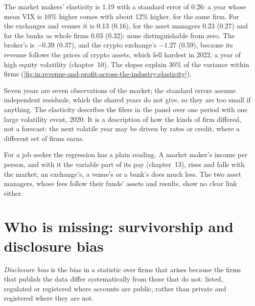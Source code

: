 The market makers' elasticity is 1.19 with a standard error of 0.26: a year whose mean VIX is 10\% higher comes with
 about 12\% higher, for the same firm. For the exchanges and venues it is 0.13 (0.16), for the asset
managers 0.23 (0.27) and for the banks as whole firms 0.03 (0.32): none distinguishable from zero. The broker's is
$-0.39$ (0.37), and the crypto exchange's $-1.27$ (0.59), because its revenue follows the prices of crypto assets, which
fell hardest in 2022, a year of high equity volatility (chapter~10). The slopes explain 30\% of the variance within
firms (\cref{fig:in:revenue-and-profit-across-the-industry:elasticity}).

\begin{remark}\label{rem:in:revenue-and-profit-across-the-industry:elasticity}
Seven years are seven observations of the market; the standard errors assume independent residuals, which the shared
years do not give, so they are too small if anything. The elasticity describes the filers in the panel over one period
with one large volatility event, 2020. It is a description of how the kinds of firm differed, not a forecast: the next
volatile year may be driven by rates or credit, where a different set of firms earns.
\end{remark}

For a job seeker the regression has a plain reading. A market maker's income per person, and with it the variable part
of its pay (chapter~13), rises and falls with the market; an exchange's, a venue's or a bank's does much less.
The two asset managers, whose fees follow their funds' assets and results, show no clear link either.

\section{Who is missing: survivorship and disclosure bias}

\begin{definition}\label{def:in:revenue-and-profit-across-the-industry:disclosure}
\emph{Disclosure bias} is the bias in a statistic over firms that arises because the firms that
publish the data differ systematically from those that do not: listed, regulated or registered where accounts are
public, rather than private and registered where they are not.
\end{definition}

